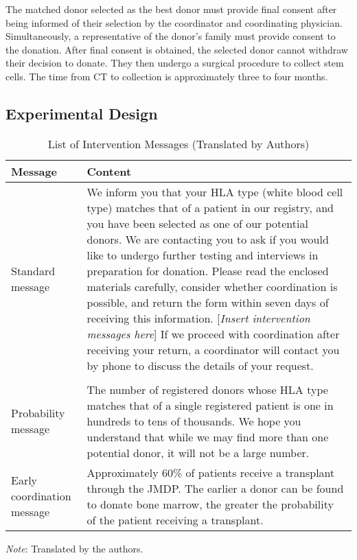 \documentclass[12pt, a4paper]{article}
\begin{document}
The matched donor selected as the best donor must provide final consent after being informed of their selection by the coordinator and coordinating physician. Simultaneously, a representative of the donor's family must provide consent to the donation. After final consent is obtained, the selected donor cannot withdraw their decision to donate. They then undergo a surgical procedure to collect stem cells. The time from CT to collection is approximately three to four months.

\hypertarget{design}{%
\subsection{Experimental Design}\label{design}}

\begin{table}

\caption{\label{tab:list-message}List of Intervention Messages (Translated by Authors)}
\centering
\fontsize{8}{10}\selectfont
\begin{threeparttable}
\begin{tabular}[t]{l>{\raggedright\arraybackslash}p{40em}}
\toprule
Message & Content\\
\midrule
Standard message & We inform you that your HLA type (white blood cell type) matches that of a patient in our registry, and you have been selected as one of our potential donors. We are contacting you to ask if you would like to undergo further testing and interviews in preparation for donation. Please read the enclosed materials carefully, consider whether coordination is possible, and return the form within seven days of receiving this information. [\emph{Insert intervention messages here}] If we proceed with coordination after receiving your return, a coordinator will contact you by phone to discuss the details of your request.\\
\addlinespace[0.3em]
\multicolumn{2}{l}{\textbf{Intervention message}}\\
\hspace{1em}Probability message & The number of registered donors whose HLA type matches that of a single registered patient is one in hundreds to tens of thousands. We hope you understand that while we may find more than one potential donor, it will not be a large number.\\
\hspace{1em}Early coordination message & Approximately 60\% of patients receive a transplant through the JMDP. The earlier a donor can be found to donate bone marrow, the greater the probability of the patient receiving a transplant.\\
\bottomrule
\end{tabular}
\begin{tablenotes}
\item \emph{Note}: Translated by the authors.
\end{tablenotes}
\end{threeparttable}
\end{table}
\end{document}
